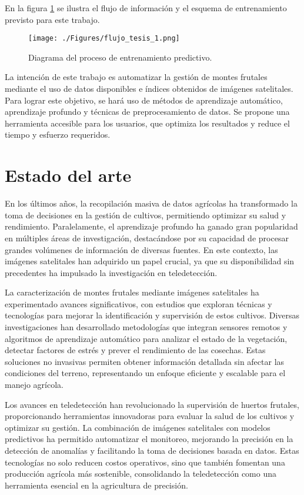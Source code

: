 En la figura \ref{fig:diagramatesis} se ilustra el flujo de información y el esquema de entrenamiento 
previsto para este trabajo.

\begin{figure}[h]
	\centering
	\texttt{[image: ./Figures/flujo\_tesis\_1.png]}
	\caption{Diagrama del proceso de entrenamiento predictivo.}
	\label{fig:diagramatesis}
\end{figure}


La intención de este trabajo es automatizar la gestión de montes frutales mediante el 
uso de datos disponibles e índices obtenidos de imágenes satelitales. Para lograr este
objetivo, se hará uso de métodos de aprendizaje automático, aprendizaje profundo y 
técnicas de preprocesamiento de datos. Se propone una herramienta accesible para los 
usuarios, que optimiza los resultados y reduce el tiempo y esfuerzo requeridos.

\section{Estado del arte}

En los últimos años, la recopilación masiva de datos agrícolas ha transformado la 
toma de decisiones en la gestión de cultivos, permitiendo optimizar su salud y 
rendimiento. Paralelamente, el aprendizaje profundo ha ganado gran popularidad en
múltiples áreas de investigación, destacándose por su capacidad de procesar
grandes volúmenes de información de diversas fuentes. En este contexto, las 
imágenes satelitales han adquirido un papel crucial, ya que su disponibilidad 
sin precedentes ha impulsado la investigación en teledetección. 

La caracterización de montes frutales mediante imágenes satelitales ha 
experimentado avances significativos, con estudios que exploran técnicas y
tecnologías para mejorar la identificación y supervisión de estos cultivos.
Diversas investigaciones han desarrollado metodologías que integran sensores 
remotos y algoritmos de aprendizaje automático para analizar el estado de la 
vegetación, detectar factores de estrés y prever el rendimiento de las cosechas. 
Estas soluciones no invasivas permiten obtener información detallada sin afectar
las condiciones del terreno, representando un enfoque eficiente y escalable 
para el manejo agrícola.

Los avances en teledetección han revolucionado la supervisión de huertos frutales, proporcionando herramientas innovadoras para evaluar la salud de los cultivos y optimizar su gestión. La combinación de imágenes satelitales con modelos predictivos ha permitido automatizar el monitoreo, mejorando la precisión en la detección de anomalías y facilitando la toma de decisiones basada en datos. Estas tecnologías no solo reducen costos operativos, sino que también fomentan una producción agrícola más sostenible, consolidando la teledetección como una herramienta esencial en la agricultura de precisión.
